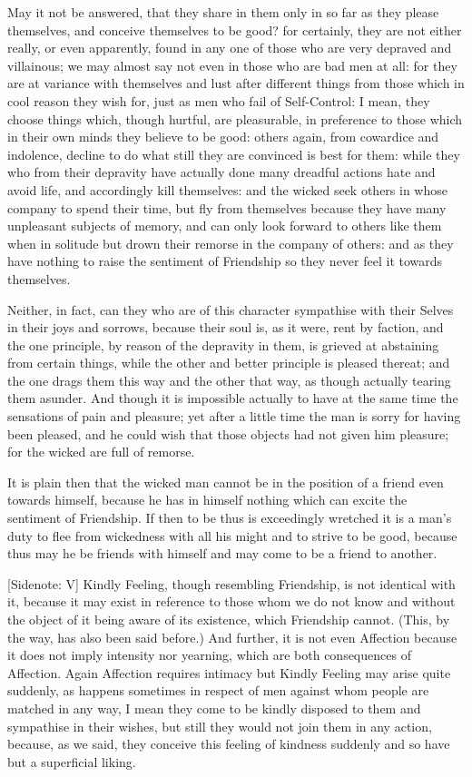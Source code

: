 May it not be answered, that they share in them only in so far as they
please themselves, and conceive themselves to be good? for certainly,
they are not either really, or even apparently, found in any one of
those who are very depraved and villainous; we may almost say not
even in those who are bad men at all: for they are at variance with
themselves and lust after different things from those which in cool
reason they wish for, just as men who fail of Self-Control: I mean, they
choose things which, though hurtful, are pleasurable, in preference to
those which in their own minds they believe to be good: others again,
from cowardice and indolence, decline to do what still they are
convinced is best for them: while they who from their depravity have
actually done many dreadful actions hate and avoid life, and accordingly
kill themselves: and the wicked seek others in whose company to spend
their time, but fly from themselves because they have many unpleasant
subjects of memory, and can only look forward to others like them when
in solitude but drown their remorse in the company of others: and as
they have nothing to raise the sentiment of Friendship so they never
feel it towards themselves.

Neither, in fact, can they who are of this character sympathise with
their Selves in their joys and sorrows, because their soul is, as it
were, rent by faction, and the one principle, by reason of the depravity
in them, is grieved at abstaining from certain things, while the other
and better principle is pleased thereat; and the one drags them this way
and the other that way, as though actually tearing them asunder. And
though it is impossible actually to have at the same time the sensations
of pain and pleasure; yet after a little time the man is sorry for
having been pleased, and he could wish that those objects had not given
him pleasure; for the wicked are full of remorse.

It is plain then that the wicked man cannot be in the position of a
friend even towards himself, because he has in himself nothing which can
excite the sentiment of Friendship. If then to be thus is exceedingly
wretched it is a man's duty to flee from wickedness with all his might
and to strive to be good, because thus may he be friends with himself
and may come to be a friend to another.

[Sidenote: V] Kindly Feeling, though resembling Friendship, is not
identical with it, because it may exist in reference to those whom we
do not know and without the object of it being aware of its existence,
which Friendship cannot. (This, by the way, has also been said before.)
And further, it is not even Affection because it does not imply
intensity nor yearning, which are both consequences of Affection. Again
Affection requires intimacy but Kindly Feeling may arise quite suddenly,
as happens sometimes in respect of men against whom people are matched
in any way, I mean they come to be kindly disposed to them and
sympathise in their wishes, but still they would not join them in any
action, because, as we said, they conceive this feeling of kindness
suddenly and so have but a superficial liking.

